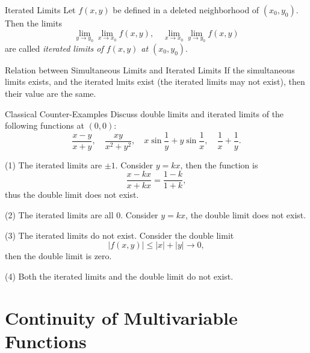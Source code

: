 \begin{definition}{Iterated Limits}{}
  Let $f(x, y)$ be defined in a deleted neighborhood of $(x_0, y_0)$.
  Then the limits
  \begin{equation}
    \lim \limits _{y \rightarrow y_0} \lim \limits _{x \rightarrow x_0} f(x,y), \quad
    \lim \limits _{x \rightarrow x_0} \lim \limits _{y\rightarrow y_0} f(x,y)
  \end{equation}
  are called \emph{iterated limits of $f(x,y)$ at $(x_0, y_0)$}.
\end{definition}

\begin{proposition}{Relation between Simultaneous Limits and Iterated Limits}{}
  If the simultaneous limits exists,
  and the iterated lmits exist (the iterated limits may not exist),
  then their value are the same.
\end{proposition}

\begin{example}{Classical Counter-Examples}{}
  Discuss double limits and iterated limits of the following functions at $(0, 0)$:
  \begin{equation}
    \frac{x - y}{x + y}, \quad
    \frac{xy}{x^2 + y^2}, \quad
    x \sin \frac{1}{y} + y \sin \frac{1}{x}, \quad
    \frac{1}{x} + \frac{1}{y}.
  \end{equation}
\end{example}

\begin{solution}
  (1) The iterated limits are $\pm 1$.
  Consider $y = kx$, then the function is
  \begin{equation}
    \frac{x - kx}{x + kx} = \frac{1 - k}{1 + k},
  \end{equation}
  thus the double limit does not exist.

  (2) The iterated limits are all $0$.
  Consider $y = kx$, the double limit does not exist.

  (3) The iterated limits do not exist.
  Consider the double limit
  \begin{equation}
    |f(x, y)| \leq |x| + |y| \rightarrow 0,
  \end{equation}
  then the double limit is zero.

  (4) Both the iterated limits and the double limit do not exist.
\end{solution}

\section{Continuity of Multivariable Functions}

